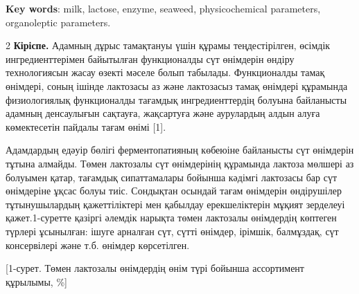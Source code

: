 {\bfseries Key words}: milk, lactose, enzyme, seaweed, physicochemical
parameters, organoleptic parameters.

\begin{multicols}{2}
{\bfseries Кіріспе.} Адамның дұрыс тамақтануы үшін құрамы теңдестірілген,
өсімдік ингредиенттерімен байытылған функционалды сүт өнімдерін өндіру
технологиясын жасау өзекті мәселе болып табылады. Функционалды тамақ
өнімдері, соның ішінде лактозасы аз және лактозасыз тамақ өнімдері
құрамында физиологиялық функционалды тағамдық ингредиенттердің болуына
байланысты адамның денсаулығын сақтауға, жақсартуға және аурулардың
алдын алуға көмектесетін пайдалы тағам өнімі {[}1{]}.

Адамдардың едәуір бөлігі ферментопатияның көбеюіне байланысты сүт
өнімдерін тұтына алмайды. Төмен лактозалы сүт өнімдерінің құрамында
лактоза мөлшері аз болуымен қатар, тағамдық сипаттамалары бойынша
кәдімгі лактозасы бар сүт өнімдеріне ұқсас болуы тиіс. Сондықтан осындай
тағам өнімдерін өндірушілер тұтынушылардың қажеттіліктері мен қабылдау
ерекшеліктерін мұқият зерделеуі қажет.1-суретте қазіргі әлемдік нарықта
төмен лактозалы өнімдердің көптеген түрлері ұсынылған: ішуге арналған
сүт, сүтті өнімдер, ірімшік, балмұздақ, сүт консервілері және т.б.
өнімдер көрсетілген.
\end{multicols}

[1-сурет. Төмен лактозалы өнімдердің
өнім түрі бойынша ассортимент құрылымы, \%]

